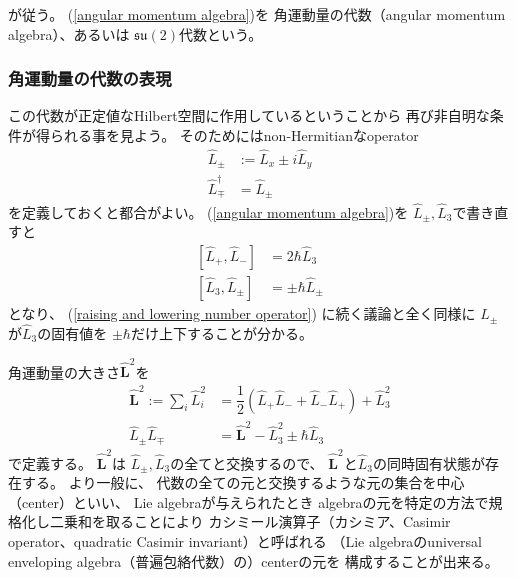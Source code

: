 が従う。
(\ref{angular momentum algebra})を
角運動量の代数（angular momentum algebra）、あるいは
$\mathfrak{su}(2)$代数という。

\subsubsection{角運動量の代数の表現}

この代数が正定値なHilbert空間に作用しているということから
再び非自明な条件が得られる事を見よう。
そのためにはnon-Hermitianなoperator
\begin{align}
    \hat{L}_\pm
    &:=
    \hat{L}_x
    \pm
    i \hat{L}_y
\\
    \hat{L}_\mp^\dagger
    &=
    \hat{L}_\pm
\end{align}
を定義しておくと都合がよい。
(\ref{angular momentum algebra})を
$\hat{L}_\pm, \hat{L}_3$で書き直すと
\begin{subequations}
\begin{align}
    [\hat{L}_+, \hat{L}_-]
    &= 2 \hbar \hat{L}_3
\\
    [\hat{L}_3, \hat{L}_\pm]
    &= \pm \hbar \hat{L}_\pm
\label{angular momentum creation annihilation}
\end{align}
\label{angular momentum algebra with L_pm}
\end{subequations}
となり、
(\ref{raising and lowering number operator})
に続く議論と全く同様に
$\hat{L}_\pm$が$\hat{L}_3$の固有値を
$\pm \hbar$だけ上下することが分かる。

角運動量の大きさ$\hat{\bm{L}}^2$を
\begin{align}
    \hat{\bm{L}}^2
    := \sum_i \hat{L}_i^2
&=
    \dfrac{1}{2}
    \left(
        \hat{L}_+ \hat{L}_-
    +
        \hat{L}_- \hat{L}_+
    \right)
    +
    \hat{L}_3^2
\\
    \hat{L}_\pm \hat{L}_\mp
    &=
    \hat{\bm{L}}^2 - \hat{L}_3^2
    \pm \hbar \hat{L}_3
\label{angular momentum raising lowering into l^2 and l_3}
\end{align}
で定義する。
$\hat{\bm{L}}^2$は
$\hat{L}_\pm, \hat{L}_3$の全てと交換するので、
$\hat{\bm{L}}^2$と$\hat{L}_3$の同時固有状態が存在する。
より一般に、
代数の全ての元と交換するような元の集合を中心（center）といい、
Lie algebraが与えられたとき
algebraの元を特定の方法で規格化し二乗和を取ることにより
カシミール演算子（カシミア、Casimir operator、quadratic Casimir invariant）と呼ばれる
（Lie algebraのuniversal enveloping algebra（普遍包絡代数）の）centerの元を
構成することが出来る。

